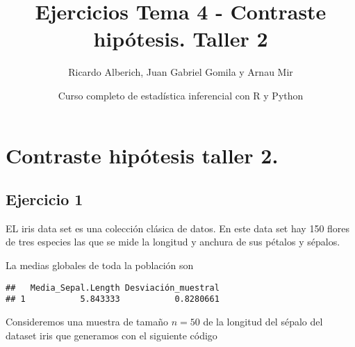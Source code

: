 \documentclass[
]{article}
\title{Ejercicios Tema 4 - Contraste hipótesis. Taller 2}
\author{Ricardo Alberich, Juan Gabriel Gomila y Arnau Mir}
\date{Curso completo de estadística inferencial con R y Python}
\newenvironment{Shaded}{\begin{snugshade}}{\end{snugshade}}
\newcommand{\CommentTok}[1]{\textcolor[rgb]{0.56,0.35,0.01}{\textit{#1}}}
\newcommand{\DataTypeTok}[1]{\textcolor[rgb]{0.13,0.29,0.53}{#1}}
\newcommand{\DecValTok}[1]{\textcolor[rgb]{0.00,0.00,0.81}{#1}}
\newcommand{\KeywordTok}[1]{\textcolor[rgb]{0.13,0.29,0.53}{\textbf{#1}}}
\newcommand{\NormalTok}[1]{#1}
\newcommand{\OperatorTok}[1]{\textcolor[rgb]{0.81,0.36,0.00}{\textbf{#1}}}
\newcommand{\OtherTok}[1]{\textcolor[rgb]{0.56,0.35,0.01}{#1}}
\newcommand{\StringTok}[1]{\textcolor[rgb]{0.31,0.60,0.02}{#1}}
\begin{document}
\maketitle

{
\hypersetup{linkcolor=blue}
\setcounter{tocdepth}{2}
\tableofcontents
}
\hypertarget{contraste-hipuxf3tesis-taller-2.}{%
\section{Contraste hipótesis taller
2.}\label{contraste-hipuxf3tesis-taller-2.}}

\hypertarget{ejercicio-1}{%
\subsection{Ejercicio 1}\label{ejercicio-1}}

EL iris data set es una colección clásica de datos. En este data set hay
150 flores de tres especies las que se mide la longitud y anchura de sus
pétalos y sépalos.

La medias globales de toda la población son

\begin{Shaded}
\end{Shaded}

\begin{verbatim}
##   Media_Sepal.Length Desviación_muestral
## 1           5.843333           0.8280661
\end{verbatim}

Consideremos una muestra de tamaño \(n=50\) de la longitud del sépalo
del dataset iris que generamos con el siguiente código

\begin{Shaded}
\end{Shaded}
\end{document}
